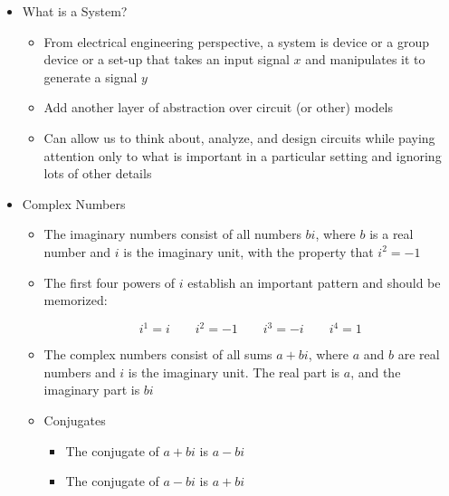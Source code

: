 \begin{itemize}

  \item What is a System?

    \begin{itemize}

      \item From electrical engineering perspective, a system is device or a group device or a set-up that takes an input signal $x$ and manipulates it to generate a signal $y$

      \item Add another layer of abstraction over circuit (or other) models

      \item Can allow us to think about, analyze, and design circuits while paying attention only to what is important in a particular setting and ignoring lots of other details

    \end{itemize}

  \item Complex Numbers

    \begin{itemize}

      \item The imaginary numbers consist of all numbers $bi$, where $b$ is a real number and $i$ is the imaginary unit, with the property that $i^2=-1$

      \item The first four powers of $i$ establish an important pattern and should be memorized:

        $$\boxed{i^1=i\,\,\,\,\,\,\,\,\,\,\,\,i^2=-1\,\,\,\,\,\,\,\,\,\,\,\,i^3=-i\,\,\,\,\,\,\,\,\,\,\,\,i^4=1}$$

      \item The complex numbers consist of all sums $a + bi$, where $a$ and $b$ are real numbers and $i$ is the imaginary unit.  The real part is $a$, and the imaginary part is $bi$

      \item Conjugates

        \begin{itemize}

          \item The conjugate of $a+bi$ is $a-bi$

          \item The conjugate of $a-bi$ is $a+bi$

        \end{itemize}


\end{itemize}
\end{itemize}
